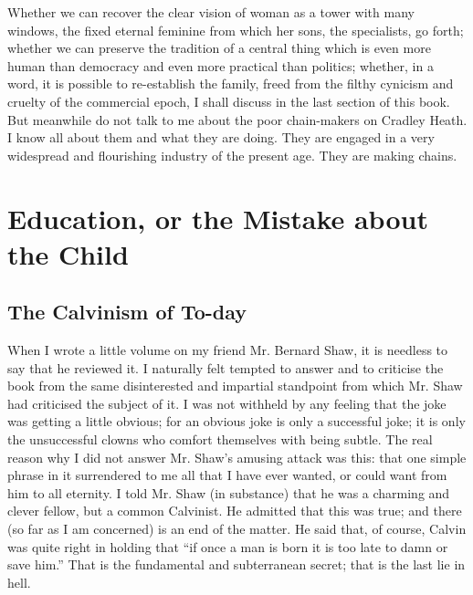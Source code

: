 \documentclass{book}
\begin{document}
Whether we can recover the clear vision of woman as a tower with many windows, the fixed eternal feminine from which her sons, the specialists, go forth; whether we can preserve the tradition of a central thing which is even more human than democracy and even more practical than politics; whether, in a word, it is possible to re-establish the family, freed from the filthy cynicism and cruelty of the commercial epoch, I shall discuss in the last section of this book. But meanwhile do not talk to me about the poor chain-makers on Cradley Heath. I know all about them and what they are doing. They are engaged in a very widespread and flourishing industry of the present age. They are making chains.

\setcounter{chapter}{0}\part{Education, or the Mistake about the Child}
\label{chapter-31}
\chapter{The Calvinism of To-day}
\label{chapter-32}
When I wrote a little volume on my friend Mr. Bernard Shaw, it is needless to say that he reviewed it. I naturally felt tempted to answer and to criticise the book from the same disinterested and impartial standpoint from which Mr. Shaw had criticised the subject of it. I was not withheld by any feeling that the joke was getting a little obvious; for an obvious joke is only a successful joke; it is only the unsuccessful clowns who comfort themselves with being subtle. The real reason why I did not answer Mr. Shaw’s amusing attack was this: that one simple phrase in it surrendered to me all that I have ever wanted, or could want from him to all eternity. I told Mr. Shaw (in substance) that he was a charming and clever fellow, but a common Calvinist. He admitted that this was true; and there (so far as I am concerned) is an end of the matter. He said that, of course, Calvin was quite right in holding that “if once a man is born it is too late to damn or save him.” That is the fundamental and subterranean secret; that is the last lie in hell.
\end{document}
